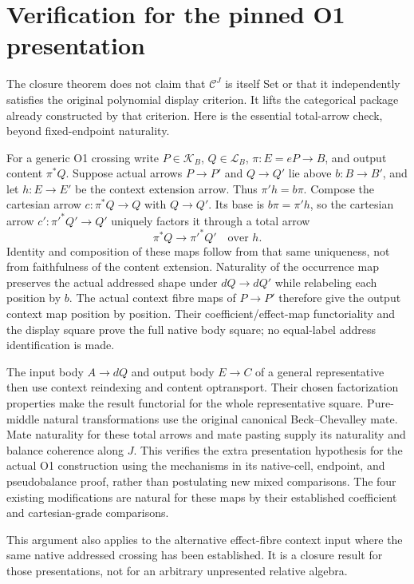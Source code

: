 \documentclass[11pt]{article}
\begin{document}
\section{Verification for the pinned O1 presentation}
The closure theorem does not claim that $\mathcal C^J$ is itself Set or that it independently satisfies the original polynomial display criterion. It lifts the categorical package already constructed by that criterion. Here is the essential total-arrow check, beyond fixed-endpoint naturality.

For a generic O1 crossing write $P\in\mathcal K_B$, $Q\in\mathcal L_B$, $\pi:E=eP\to B$, and output content $\pi^*Q$. Suppose actual arrows $P\to P'$ and $Q\to Q'$ lie above $b:B\to B'$, and let $h:E\to E'$ be the context extension arrow. Thus $\pi'h=b\pi$. Compose the cartesian arrow $c:\pi^*Q\to Q$ with $Q\to Q'$. Its base is $b\pi=\pi'h$, so the cartesian arrow $c':\pi'^*Q'\to Q'$ uniquely factors it through a total arrow
\[
 \pi^*Q\longrightarrow\pi'^*Q'\quad\text{over }h.
\]
Identity and composition of these maps follow from that same uniqueness, not from faithfulness of the content extension. Naturality of the occurrence map preserves the actual addressed shape under $dQ\to dQ'$ while relabeling each position by $b$. The actual context fibre maps of $P\to P'$ therefore give the output context map position by position. Their coefficient/effect-map functoriality and the display square prove the full native body square; no equal-label address identification is made.

The input body $A\to dQ$ and output body $E\to C$ of a general representative then use context reindexing and content optransport. Their chosen factorization properties make the result functorial for the whole representative square. Pure-middle natural transformations use the original canonical Beck--Chevalley mate. Mate naturality for these total arrows and mate pasting supply its naturality and balance coherence along $J$. This verifies the extra presentation hypothesis for the actual O1 construction using the mechanisms in its native-cell, endpoint, and pseudobalance proof, rather than postulating new mixed comparisons. The four existing modifications are natural for these maps by their established coefficient and cartesian-grade comparisons.

This argument also applies to the alternative effect-fibre context input where the same native addressed crossing has been established. It is a closure result for those presentations, not for an arbitrary unpresented relative algebra.
\end{document}
